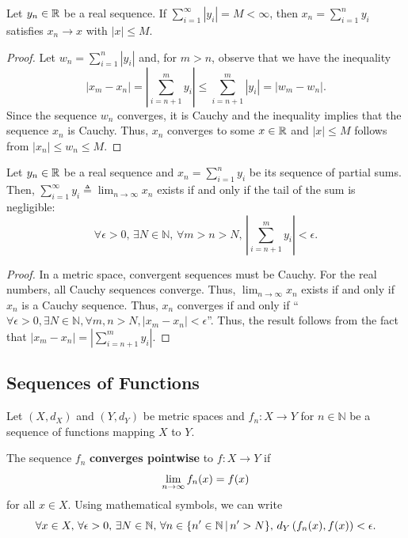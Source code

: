 \begin{lemma} \label{lem:abs_sum_convergence}
Let $y_n \in \mathbb{R}$ be a real sequence.
If $\sum_{i=1}^\infty |y_i| = M < \infty$, then $x_n = \sum_{i=1}^n y_i$ satisfies $x_n \to x$ with $|x|\leq M$.
\end{lemma}
\begin{proof}
Let $w_n = \sum_{i=1}^n |y_i|$ and, for $m>n$, observe that we have the inequality
\[|x_m - x_n| = \left| \sum_{i=n+1}^m y_i \right| \leq \sum_{i=n+1}^m |y_i| = | w_m - w_n|. \]
Since the sequence $w_n$ converges, it is Cauchy and %
the inequality implies that the sequence $x_n$ is Cauchy.
Thus, $x_n$ converges to some $x\in \mathbb{R}$ and $|x| \leq M$ follows from  $|x_n| \leq w_n \leq M$.
\end{proof}

\begin{lemma} \label{lem:sum_convergence}
Let $y_n \in \mathbb{R}$ be a real sequence and $x_n = \sum_{i=1}^n y_i$ be its sequence of partial sums.
Then, $\sum_{i=1}^\infty y_i \triangleq \lim_{n\to \infty} x_n$ exists if and only if the tail of the sum is negligible:
\[ \forall \epsilon > 0, \, \exists N \in \mathbb{N}, \, \forall m>n>N, \, \left| \sum_{i=n+1}^m y_i \right| < \epsilon. \]
\end{lemma}
\begin{proof}
In a metric space, convergent sequences must be Cauchy.
For the real numbers, all Cauchy sequences converge.
Thus, $\lim_{n\to\infty} x_n$ exists if and only if $x_n$ is a Cauchy sequence.
Thus, $x_n$ converges if and only if ``$\forall \epsilon>0, \exists N\in \mathbb{N}, \forall m,n>N, |x_m - x_n|< \epsilon$''.
Thus, the result follows from the fact that $|x_m - x_n| = \left| \sum_{i=n+1}^m y_i \right|$.
\end{proof}



\subsection{Sequences of Functions}

Let $(X,d_X)$ and $(Y,d_Y)$ be metric spaces and
$f_n \colon X \to Y$ for $n\in \mathbb{N}$ be a sequence of functions mapping $X$ to $Y$.

\begin{definition}
The sequence $f_n$ \textbf{converges pointwise} to $f\colon X \to Y$ if \vspace{-1mm}
\[ \lim_{n\to \infty} f_n (x) = f(x) \vspace*{-1mm} \]
for all $x \in X$.
Using mathematical symbols, we can write \vspace{-1mm}
\[ \forall x\in X, \, \forall \epsilon > 0, \, \exists N\in \mathbb{N}, \, \forall n \in \{ n' \in \mathbb{N}\,|\, n'>N \}, \, d_Y \left( f_n(x),f(x) \right) < \epsilon. \vspace*{-1mm} \]
\end{definition}

